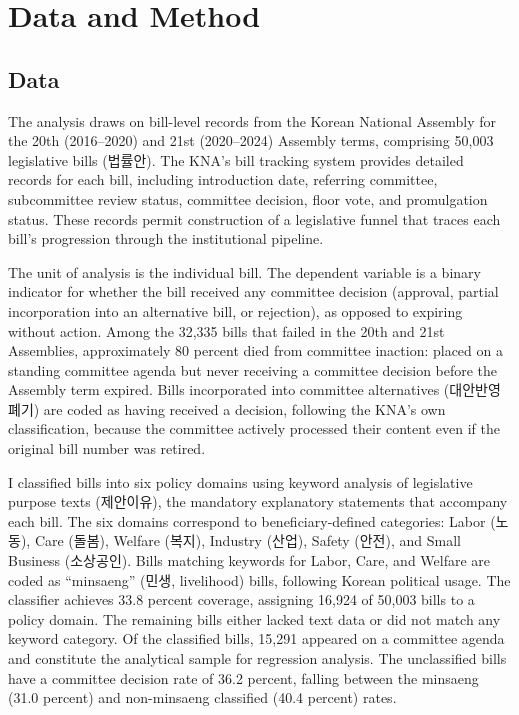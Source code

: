 \documentclass[11pt]{article}
\begin{document}
\section{Data and Method}

\subsection{Data}

The analysis draws on bill-level records from the Korean National Assembly for the 20th (2016--2020) and 21st (2020--2024) Assembly terms, comprising 50,003 legislative bills (법률안). The KNA's bill tracking system provides detailed records for each bill, including introduction date, referring committee, subcommittee review status, committee decision, floor vote, and promulgation status. These records permit construction of a legislative funnel that traces each bill's progression through the institutional pipeline.

The unit of analysis is the individual bill. The dependent variable is a binary indicator for whether the bill received any committee decision (approval, partial incorporation into an alternative bill, or rejection), as opposed to expiring without action. Among the 32,335 bills that failed in the 20th and 21st Assemblies, approximately 80 percent died from committee inaction: placed on a standing committee agenda but never receiving a committee decision before the Assembly term expired. Bills incorporated into committee alternatives (대안반영폐기) are coded as having received a decision, following the KNA's own classification, because the committee actively processed their content even if the original bill number was retired.

I classified bills into six policy domains using keyword analysis of legislative purpose texts (제안이유), the mandatory explanatory statements that accompany each bill. The six domains correspond to beneficiary-defined categories: Labor (노동), Care (돌봄), Welfare (복지), Industry (산업), Safety (안전), and Small Business (소상공인). Bills matching keywords for Labor, Care, and Welfare are coded as ``minsaeng'' (민생, livelihood) bills, following Korean political usage. The classifier achieves 33.8 percent coverage, assigning 16,924 of 50,003 bills to a policy domain. The remaining bills either lacked text data or did not match any keyword category. Of the classified bills, 15,291 appeared on a committee agenda and constitute the analytical sample for regression analysis. The unclassified bills have a committee decision rate of 36.2 percent, falling between the minsaeng (31.0 percent) and non-minsaeng classified (40.4 percent) rates.
\end{document}
